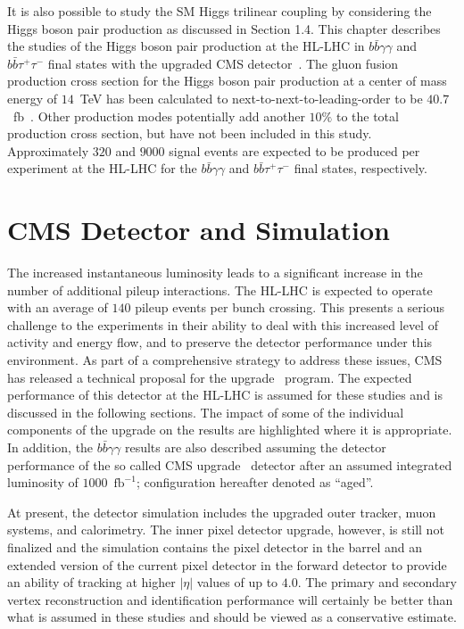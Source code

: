 It is also possible to study the SM Higgs trilinear coupling by considering the Higgs boson pair production as discussed in Section 1.4. This chapter describes the studies of the Higgs boson pair production at the HL-LHC in $b\bar{b}\gamma\gamma$ and $b\bar{b}\tau^{+}\tau^{-}$ final states with the upgraded CMS detector~\cite{CMS-PAS-FTR-15-002}. The gluon fusion production cross section for the Higgs boson pair production at a center of mass energy of $14$~TeV has been calculated to next-to-next-to-leading-order to be $40.7$~fb~\cite{Dawson:1998py,Grigo:2014jma}. Other production modes potentially add another $10\%$ to the total production cross section, but have not been included in this study. Approximately $320$ and  $9000$ signal events are expected to be produced per experiment at the HL-LHC for the $b\bar{b}\gamma\gamma$ and $b\bar{b}\tau^{+}\tau^{-}$ final states, respectively.

\section{CMS \phasetwo Detector and Simulation}

The increased instantaneous luminosity leads to a significant increase in the number of additional pileup interactions. The HL-LHC is expected to operate with an average of $140$ pileup events per bunch crossing. This presents a serious challenge to the experiments in their ability to deal with this increased level of activity and energy flow, and to preserve the detector performance under this environment.  As part of a comprehensive strategy to address these issues, CMS has released a technical proposal for the \phasetwo upgrade~\cite{Butler:2020886} program. The expected performance of this detector at the HL-LHC is assumed for these studies and is discussed in the following sections. The impact of some of the individual components of the \phasetwo upgrade on the results are highlighted where it is appropriate. In addition, the $b\bar{b}\gamma\gamma$ results are also described assuming the detector performance of the so called \phaseone CMS upgrade~\cite{Collaboration:1355706} detector after an assumed integrated luminosity of $1000$~$\mathrm{fb}^{-1}$; configuration hereafter denoted as ``\phaseone aged''.

At present, the \phasetwo detector simulation includes the upgraded outer tracker, muon systems, and calorimetry. The inner pixel detector upgrade, however, is still not finalized and the simulation contains the \phaseone pixel detector in the barrel and an extended version of the current pixel detector in the forward detector to provide an ability of tracking at higher $|\eta|$ values of up to $4.0$. The primary and secondary vertex reconstruction and identification performance will certainly be better than what is assumed in these studies and should be viewed as a conservative estimate.

